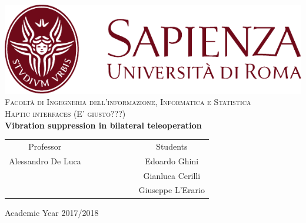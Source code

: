 \begin{titlepage}
\begin{center}
	\includegraphics[scale=0.8]{Images/SapienzaLogo} \\
	\vspace{3em}
	{\large \textsc{Facoltà di  Ingegneria dell'informazione, Informatica e Statistica}} \\
	\vspace{2em}
	{\large \textsc{Haptic interfaces (E' giusto???) }} \\
	\doublespacing
	\vspace{5em}
	{\Large \textbf{Vibration suppression in bilateral teleoperation}}
\end{center}

\vskip 2cm
\begin{center}
\begin{tabular}{c c c c c c c c}
	Professor & & & & & & & Students \\[0.2cm]
	\large{Alessandro De Luca} & & & & & & & \large{Edoardo Ghini}\\[0.4cm]
	\large{} & & & & & & & \large{Gianluca Cerilli}\\[0.4cm]
	\large{} & & & & & & & \large{Giuseppe L'Erario}\\[0.4cm]
\end{tabular}
\end{center}

\vskip 1.5cm
\begin{center}
	{\normalsize Academic Year 2017/2018}
\end{center}
\end{titlepage}

\clearpage{\pagestyle{empty}\cleardoublepage}

\vspace{5em}

\onehalfspacing

\clearpage{\pagestyle{empty}\cleardoublepage}
